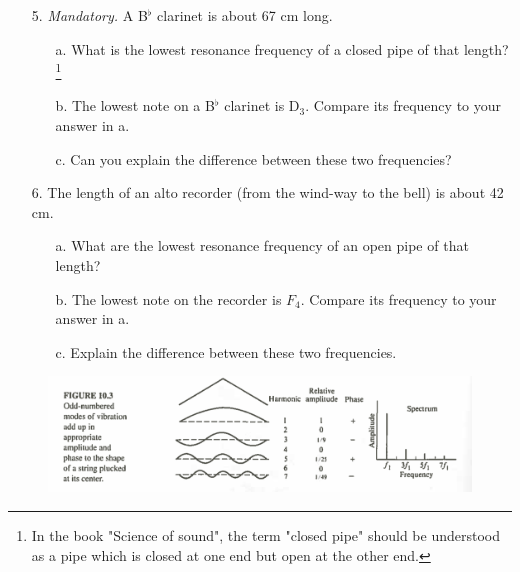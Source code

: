 \documentclass{article}
\begin{document}
\begin{itemize}
       \item [5.] \textit{Mandatory.} A B$^\flat$ clarinet is about 67 cm long.
        \begin{itemize}
            \item[a.] What is the lowest resonance frequency of a closed pipe of that length?\footnote{In the book "Science of sound", the term "closed pipe" should be understood as a pipe which is closed at one end but open at the other end.}
            \item[b.] The lowest note on a B$^\flat$ clarinet is D$_3$. Compare its frequency to your answer in a.
            \item[c.] Can you explain the difference between these two frequencies?
        \end{itemize}
 
  \item[6.] The length of an alto recorder (from the wind-way to the bell) is about  42 cm.
        \begin{itemize}
            \item[a.] What are the lowest resonance frequency of an open pipe of that length?
            \item[b.] The lowest note on the recorder is $F_4$. Compare its frequency to your answer in a.
            \item[c.] Explain the difference between  these  two frequencies.
        \end{itemize}




\end{itemize}


\begin{figure}[H]
    \centering
    \includegraphics[scale = 0.8]{figures/fig10_3.png}
\end{figure}
\end{document}
